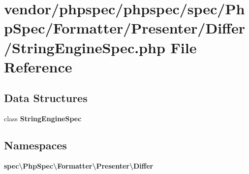 \section{vendor/phpspec/phpspec/spec/\+Php\+Spec/\+Formatter/\+Presenter/\+Differ/\+String\+Engine\+Spec.php File Reference}
\label{_string_engine_spec_8php}
\subsection*{Data Structures}
\begin{DoxyCompactItemize}
\item 
class {\bf String\+Engine\+Spec}
\end{DoxyCompactItemize}
\subsection*{Namespaces}
\begin{DoxyCompactItemize}
\item 
 {\bf spec\textbackslash{}\+Php\+Spec\textbackslash{}\+Formatter\textbackslash{}\+Presenter\textbackslash{}\+Differ}
\end{DoxyCompactItemize}
